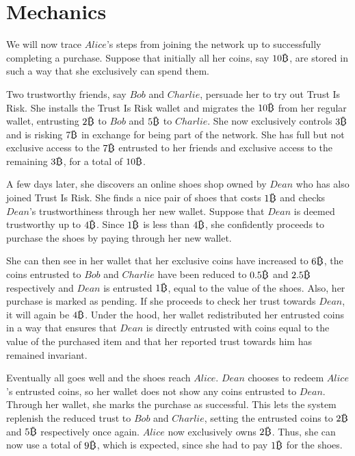 \section{Mechanics}
  We will now trace $Alice$'s steps from joining the network up to successfully completing a purchase. Suppose that initially
  all her coins, say $10\bitcoin$, are stored in such a way that she exclusively can spend them.

  Two trustworthy friends, say $Bob$ and $Charlie$, persuade her to try out Trust Is Risk. She installs the Trust Is Risk
  wallet and migrates the $10\bitcoin$ from her regular wallet, entrusting $2\bitcoin$ to $Bob$ and $5\bitcoin$ to $Charlie$.
  She now exclusively controls $3\bitcoin$ and is risking $7\bitcoin$ in exchange for being part of the network. She has full
  but not exclusive access to the $7\bitcoin$ entrusted to her friends and exclusive access to the remaining $3\bitcoin$, for
  a total of $10\bitcoin$.

  A few days later, she discovers an online shoes shop owned by $Dean$ who has also joined Trust Is Risk. She finds a nice
  pair of shoes that costs $1\bitcoin$ and checks $Dean$'s trustworthiness through her new wallet. Suppose that $Dean$ is
  deemed trustworthy up to $4\bitcoin$. Since $1\bitcoin$ is less than $4\bitcoin$, she confidently proceeds to purchase the
  shoes by paying through her new wallet.

  She can then see in her wallet that her exclusive coins have increased to $6\bitcoin$, the coins entrusted to $Bob$ and
  $Charlie$ have been reduced to $0.5\bitcoin$ and $2.5\bitcoin$ respectively and $Dean$ is entrusted $1\bitcoin$, equal to
  the value of the shoes. Also, her purchase is marked as pending. If she proceeds to check her trust towards $Dean$, it will
  again be $4\bitcoin$. Under the hood, her wallet redistributed her entrusted coins in a way that ensures that $Dean$ is
  directly entrusted with coins equal to the value of the purchased item and that her reported trust towards him has remained
  invariant.

  Eventually all goes well and the shoes reach $Alice$. $Dean$ chooses to redeem $Alice$'s entrusted coins, so her wallet
  does not show any coins entrusted to $Dean$. Through her wallet, she marks the purchase as successful. This lets the system
  replenish the reduced trust to $Bob$ and $Charlie$, setting the entrusted coins to $2\bitcoin$ and $5\bitcoin$ respectively
  once again. $Alice$ now exclusively owns $2\bitcoin$. Thus, she can now use a total of $9\bitcoin$, which is expected,
  since she had to pay $1\bitcoin$ for the shoes.
